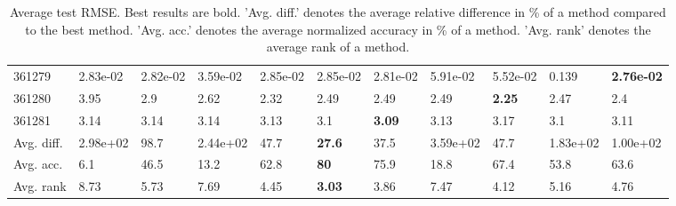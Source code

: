 \begin{table}[ht!]
\begin{tabular}{lllllllllll}
  361279 & 2.83e-02 & 2.82e-02 & 3.59e-02 & 2.85e-02 & 2.85e-02 & 2.81e-02 & 5.91e-02 & 5.52e-02 & 0.139 & \textbf{2.76e-02} \\ 
  361280 & 3.95 & 2.9 & 2.62 & 2.32 & 2.49 & 2.49 & 2.49 & \textbf{2.25} & 2.47 & 2.4 \\ 
  361281 & 3.14 & 3.14 & 3.14 & 3.13 & 3.1 & \textbf{3.09} & 3.13 & 3.17 & 3.1 & 3.11 \\ 
   \hline
Avg. diff. & 2.98e+02 & 98.7 & 2.44e+02 & 47.7 & \textbf{27.6} & 37.5 & 3.59e+02 & 47.7 & 1.83e+02 & 1.00e+02 \\ 
  Avg. acc. & 6.1 & 46.5 & 13.2 & 62.8 & \textbf{80} & 75.9 & 18.8 & 67.4 & 53.8 & 63.6 \\ 
  Avg. rank & 8.73 & 5.73 & 7.69 & 4.45 & \textbf{3.03} & 3.86 & 7.47 & 4.12 & 5.16 & 4.76 \\ 
   \hline
\hline
\end{tabular}
\endgroup
\caption{Average test RMSE. 
                  Best results are bold. 
                  'Avg. diff.' denotes the average relative difference in \% of a method compared to the best method.
                  'Avg. acc.' denotes the average normalized accuracy in \% of a method.
                  'Avg. rank' denotes the average rank of a method.} 
\label{TABLES/table_results_RMSE}
\end{table}
